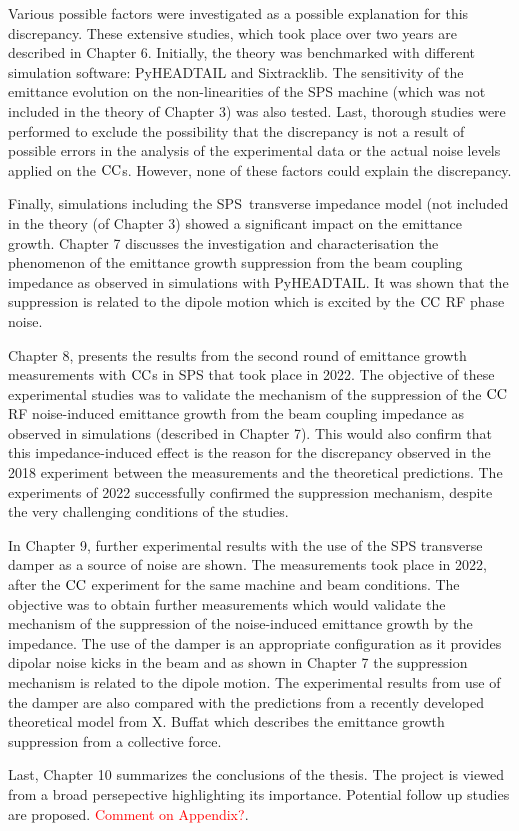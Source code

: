 Various possible factors were investigated as a possible explanation for this discrepancy. These extensive studies, which took place over two years are described in Chapter 6. Initially, the theory was benchmarked with different simulation software: PyHEADTAIL and Sixtracklib. The sensitivity of the emittance evolution on the non-linearities of the SPS machine (which was not included in the theory of Chapter 3) was also tested. Last, thorough studies were performed to exclude the possibility that the discrepancy is not a result of possible errors in the analysis of the experimental data or the actual noise levels applied on the ${\mathrm{CC}}$s. However, none of these factors could explain the discrepancy.

Finally, simulations including the SPS transverse impedance model (not included in the theory (of Chapter 3) showed a significant impact on the emittance growth. Chapter 7 discusses the investigation and characterisation the phenomenon of the emittance growth suppression from the beam coupling impedance as observed in simulations with PyHEADTAIL. It was shown that the suppression is related to the dipole motion which is excited by the ${\mathrm{CC}}$ RF phase noise.


Chapter 8, presents the results from the second round of emittance growth measurements with ${\mathrm{CC}}$s in SPS that took place in 2022. The objective of these experimental studies was to validate the mechanism of the suppression of the ${\mathrm{CC}}$ RF noise-induced emittance growth from the beam coupling impedance as observed in simulations (described in Chapter 7). This would also confirm that this impedance-induced effect is the reason for the discrepancy observed in the 2018 experiment between the measurements and the theoretical predictions. The experiments of 2022 successfully confirmed the suppression mechanism, despite the very challenging conditions of the studies.

In Chapter 9, further experimental results with the use of the SPS transverse damper as a source of noise are shown. The measurements took place in 2022, after the ${\mathrm{CC}}$ experiment for the same machine and beam conditions. The objective was to obtain further measurements which would validate the mechanism of the suppression of the noise-induced emittance growth by the impedance. The use of the damper is an appropriate configuration as it provides dipolar noise kicks in the beam and as shown in Chapter 7 the suppression mechanism is related to the dipole motion. The experimental results from use of the damper are also compared with the predictions from a recently developed theoretical model from X. Buffat which describes the emittance growth suppression from a collective force.

Last, Chapter 10 summarizes the conclusions of the thesis. The project is viewed from a broad persepective highlighting its importance. Potential follow up studies are proposed. \textcolor{red}{Comment on Appendix?}.

